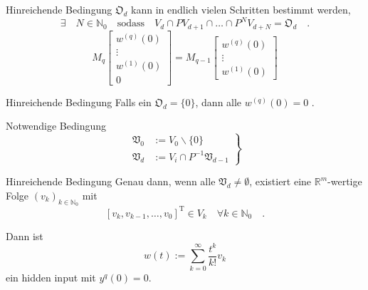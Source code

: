 \begin{frame}{Hinreichende Bedingung}
	$\mathfrak{O}_d$ kann in endlich vielen Schritten bestimmt werden, 
	\begin{equation}
	\exists \quad N \in \mathbb{N}_0 \quad \text{sodass} \quad V_d \cap PV_{d+1} \cap \ldots \cap P^NV_{d+N} = 
	\mathfrak{O}_d \quad .
	\end{equation} \pause
	\begin{equation}
	M_q\begin{bmatrix} w^{(q)}(0) \\ \vdots \\w^{(1)}(0) \\ 0 \end{bmatrix} = 
	M_{q-1}\begin{bmatrix} w^{(q)}(0) \\ \vdots \\
	w^{(1)}(0) \end{bmatrix}
	\end{equation}
	
	\begin{block}{Hinreichende Bedingung}
	Falls ein $\mathfrak{O}_d=\{0\}$, dann alle $w^{(q)}(0) = 0$ .
	\end{block} 
	
\end{frame}

\begin{frame}{Notwendige Bedingung}
	\pause
	\begin{equation} \left.
	\begin{aligned}
		\mathfrak{V}_0 &:= V_0\backslash \{0\} \\
		\mathfrak{V}_d &:= V_i \cap P^{-1}\mathfrak{V}_{d-1}
	\end{aligned}\right\} 
	\end{equation} \pause
	\begin{block}{Hinreichende Bedingung}
		Genau dann, wenn alle $\mathfrak{V}_d \neq \emptyset$, existiert eine $\mathbb{R}^m$-wertige Folge 
		$(v_k)_{k\in\mathbb{N}_0}$ mit
		\begin{equation}
		\left[v_k,v_{k-1},\ldots , v_0 \right]^\text{T} \in V_k  \quad \forall k \in \mathbb{N}_0 \quad .
		\end{equation}
	\end{block} \pause
	Dann ist
	\begin{equation}
	w(t) := \sum\limits_{k=0}^\infty \frac{t^k}{k!} v_k 
	\end{equation}
	ein hidden input mit $y^{q}(0)=0$.
\end{frame}


